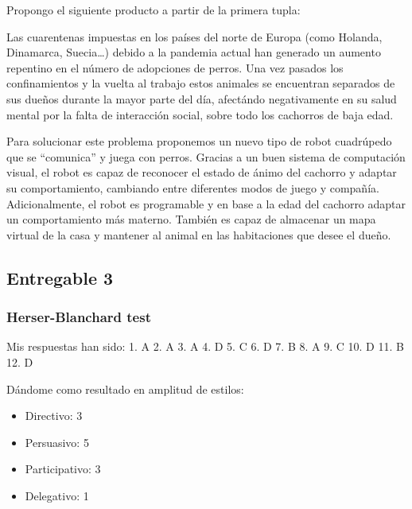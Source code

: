 \vspace{\baselineskip}

Propongo el siguiente producto a partir de la primera tupla:

\vspace{\baselineskip}

Las cuarentenas impuestas en los países del norte de Europa (como Holanda, Dinamarca, Suecia\dots) debido a la pandemia actual han generado un aumento repentino en el número de adopciones de perros. 
Una vez pasados los confinamientos y la vuelta al trabajo estos animales se encuentran separados de sus dueños durante la mayor parte del día, afectándo negativamente en su salud mental por la falta de interacción social, sobre todo los cachorros de baja edad.

\vspace{\baselineskip}

Para solucionar este problema proponemos un nuevo tipo de robot cuadrúpedo que se ``comunica'' y juega con perros. Gracias a un buen sistema de computación visual, el robot es capaz de reconocer el estado de ánimo del cachorro y adaptar su comportamiento, cambiando entre diferentes modos de juego y compañía. Adicionalmente, el robot es programable y en base a la edad del cachorro adaptar un comportamiento más materno. También es capaz de almacenar un mapa virtual de la casa y mantener al animal en las habitaciones que desee el dueño.


\subsection{Entregable 3}

\subsubsection{Herser-Blanchard test}

Mis respuestas han sido: 1. A 2. A 3. A 4. D 5. C 6. D 7. B 8. A 9. C 10. D 11. B 12. D

Dándome como resultado en amplitud de estilos:
\begin{itemize}
    \item Directivo: 3
    \item Persuasivo: 5
    \item Participativo: 3
    \item Delegativo: 1
\end{itemize}

